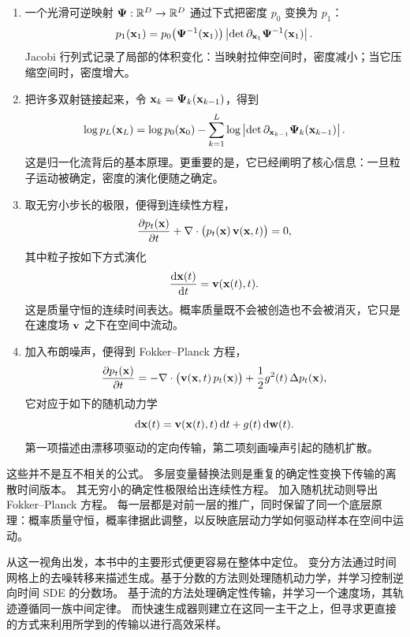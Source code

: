 \begin{enumerate}[leftmargin=2em]
    \item {}
    一个光滑可逆映射 ${\bm{\Psi}}:\mathbb{R}^D\to\mathbb{R}^D$ 通过下式把密度 $p_0$ 变换为 $p_1$：
    \[
    p_1({\mathbf{x}}_1)
    =
    p_0\bigl({\bm{\Psi}}^{-1}({\mathbf{x}}_1)\bigr)
    \left|\det \partial_{{\mathbf{x}}_1}{\bm{\Psi}}^{-1}({\mathbf{x}}_1)\right|.
    \]
    Jacobi 行列式记录了局部的体积变化：当映射拉伸空间时，密度减小；当它压缩空间时，密度增大。

    \item {}
    把许多双射链接起来，令 ${\mathbf{x}}_k={\bm{\Psi}}_k({\mathbf{x}}_{k-1})$，得到
    \[
    \log p_L({\mathbf{x}}_L)
    =
    \log p_0({\mathbf{x}}_0)
    -
    \sum_{k=1}^L
    \log\left|\det \partial_{{\mathbf{x}}_{k-1}}{\bm{\Psi}}_k({\mathbf{x}}_{k-1})\right|.
    \]
    这是归一化流背后的基本原理。更重要的是，它已经阐明了核心信息：一旦粒子运动被确定，密度的演化便随之确定。

    \item {}
    取无穷小步长的极限，便得到连续性方程，
    \[
    \frac{\partial p_t({\mathbf{x}})}{\partial t}
    +
    \nabla\cdot\bigl(p_t({\mathbf{x}})\,{\mathbf{v}}({\mathbf{x}},t)\bigr)
    =
    0,
    \]
    其中粒子按如下方式演化
    \[
    \frac{\mathop{}\!\mathrm{d} {\mathbf{x}}(t)}{\mathop{}\!\mathrm{d} t} = {\mathbf{v}}({\mathbf{x}}(t),t).
    \]
    这是质量守恒的连续时间表达。概率质量既不会被创造也不会被消灭，它只是在速度场 ${\mathbf{v}}$ 之下在空间中流动。

    \item {}
    加入布朗噪声，便得到 Fokker--Planck 方程，
    \[
    \frac{\partial p_t({\mathbf{x}})}{\partial t}
    =
    -\nabla\cdot\bigl({\mathbf{v}}({\mathbf{x}},t)\,p_t({\mathbf{x}})\bigr)
    +
    \frac{1}{2}g^2(t)\,\Delta p_t({\mathbf{x}}),
    \]
    它对应于如下的随机动力学
    \[
    \mathop{}\!\mathrm{d}{\mathbf{x}}(t) = {\mathbf{v}}({\mathbf{x}}(t),t)\mathop{}\!\mathrm{d} t + g(t)\mathop{}\!\mathrm{d}{\mathbf{w}}(t).
    \]
    第一项描述由漂移项驱动的定向传输，第二项刻画噪声引起的随机扩散。
\end{enumerate}

这些并不是互不相关的公式。
多层变量替换法则是重复的确定性变换下传输的离散时间版本。
其无穷小的确定性极限给出连续性方程。
加入随机扰动则导出 Fokker--Planck 方程。
每一层都是对前一层的推广，同时保留了同一个底层原理：概率质量守恒，概率律据此调整，以反映底层动力学如何驱动样本在空间中运动。

从这一视角出发，本书中的主要形式便更容易在整体中定位。
变分方法通过时间网格上的去噪转移来描述生成。基于分数的方法则处理随机动力学，并学习控制逆向时间 SDE 的分数场。
基于流的方法处理确定性传输，并学习一个速度场，其轨迹遵循同一族中间定律。
而快速生成器则建立在这同一主干之上，但寻求更直接的方式来利用所学到的传输以进行高效采样。

